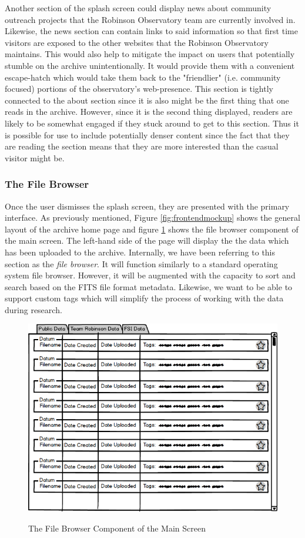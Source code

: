 \documentclass[12pt]{report}
\begin{document}
Another section of the splash screen could display news about community outreach projects that the Robinson Observatory team are currently involved in. Likewise, the news section can contain links to said information so that first time visitors are exposed to the other websites that the Robinson Observatory maintains. This would also help to mitigate the impact on users that potentially stumble on the archive unintentionally. It would provide them with a convenient escape-hatch which would take them back to the "friendlier" (i.e. community focused) portions of the observatory's web-presence. This section is tightly connected to the about section since it is also might be the first thing that one reads in the archive. However, since it is the second thing displayed, readers are likely to be somewhat engaged if they stuck around to get to this section. Thus it is possible for use to include potentially denser content since the fact that they are reading the section means that they are more interested than the casual visitor might be.

\subsubsection*{The File Browser}

Once the user dismisses the splash screen, they are presented with the primary interface. As previously mentioned, Figure \ref{fig:frontendmockup} shows the general layout of the archive home page and figure \ref{fig:frontendfilebrowser} shows the file browser component of the main screen. The left-hand side of the page will display the the data which has been uploaded to the archive. Internally, we have been referring to this section as the \textit{file browser}. It will function similarly to a standard operating system file browser. However, it will be augmented with the capacity to sort and search based on the FITS file format metadata. Likewise, we want to be able to support custom tags which will simplify the process of working with the data during research.

\begin{figure}[h]
	\centering
	\caption{The File Browser Component of the Main Screen}
	\includegraphics[scale=0.5]{frontend_file_browser}
	\label{fig:frontendfilebrowser}
\end{figure}
\end{document}
